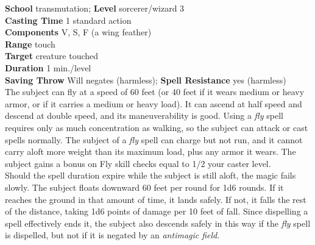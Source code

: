 \textbf{School} transmutation; \textbf{Level} sorcerer/wizard 3\\
\textbf{Casting Time} 1 standard action\\
\textbf{Components} V, S, F (a wing feather)\\
\textbf{Range} touch\\
\textbf{Target} creature touched\\
\textbf{Duration} 1 min./level\\
\textbf{Saving Throw} Will negates (harmless); \textbf{Spell Resistance} yes (harmless)\\
The subject can fly at a speed of 60 feet (or 40 feet if it wears medium or heavy armor, or if it carries a medium or heavy load). It can ascend at half speed and descend at double speed, and its maneuverability is good. Using a \textit{fly }spell requires only as much concentration as walking, so the subject can attack or cast spells normally. The subject of a \textit{fly }spell can charge but not run, and it cannot carry aloft more weight than its maximum load, plus any armor it wears. The subject gains a bonus on Fly skill checks equal to 1/2 your caster level.\\
Should the spell duration expire while the subject is still aloft, the magic fails slowly. The subject floats downward 60 feet per round for 1d6 rounds. If it reaches the ground in that amount of time, it lands safely. If not, it falls the rest of the distance, taking 1d6 points of damage per 10 feet of fall. Since dispelling a spell effectively ends it, the subject also descends safely in this way if the \textit{fly }spell is dispelled, but not if it is negated by an \textit{antimagic field}.\\
